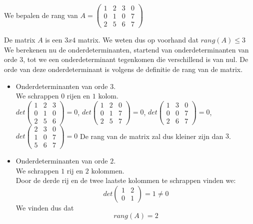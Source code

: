 \begin{voorbeeld}
	

We bepalen de rang van $A=\left( \begin{matrix}
1 & 2 & 3 & 0\\
0 & 1 & 0 & 7\\
2 & 5 & 6 & 7
\end{matrix} \right)$ 

De matrix $A$ is een $3x4$ matrix. We weten dus op voorhand dat $rang(A)\leq 3$\\

We berekenen nu de onderdeterminanten, startend van onderdeterminanten van orde $3$, tot we een onderdeterminant tegenkomen die verschillend is van nul. De orde van deze onderdeterminant is volgens de definitie de rang van de matrix.\\

\begin{itemize}
	\item Onderdeterminanten van orde $3$.\\
	We schrappen $0$ rijen en $1$ kolom.\\
	$det \left( \begin{matrix} 1 & 2 & 3\\ 0 & 1 & 0\\ 2 & 5 & 6 \end{matrix} \right)= 0$, $det \left( \begin{matrix} 1 & 2 & 0\\ 0 & 1 & 7\\ 2 & 5 & 7 \end{matrix} \right)= 0$, $det \left( \begin{matrix} 1 & 3 & 0\\ 0 & 0 & 7\\ 2 & 6 & 7 \end{matrix} \right) =0$,  $det \left( \begin{matrix} 2 & 3 & 0\\ 1 & 0 & 7\\  5 & 6 & 7 \end{matrix} \right) =0$
	De rang van de matrix zal dus kleiner zijn dan $3$.
	\item Onderdeterminanten van orde $2$.\\
	We schrappen $1$ rij en $2$ kolommen.\\
	Door de derde rij en de twee laatste kolommen te schrappen vinden we: 
	\[ det \left( \begin{matrix} 1 & 2 \\ 0 & 1 \end{matrix} \right) = 1 \neq 0 \]
	We vinden dus dat
	\[ rang(A)=2 \] 
\end{itemize}

\end{voorbeeld}


